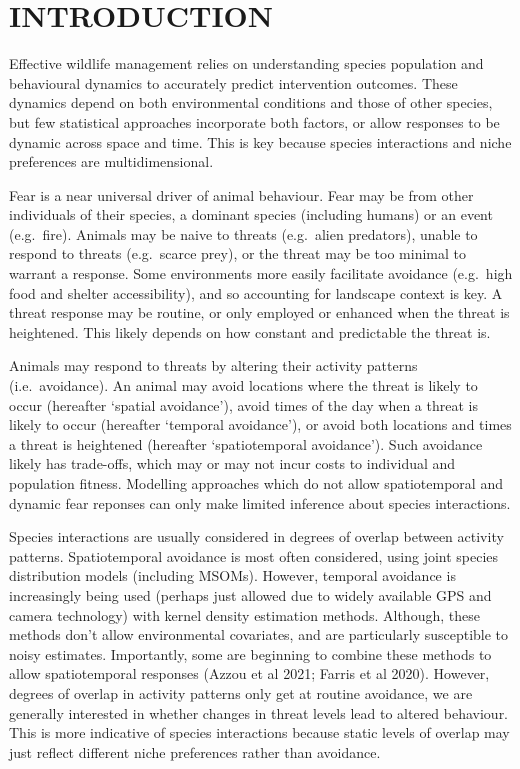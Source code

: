 \documentclass[]{elsarticle} %
\begin{document}
\hypertarget{introduction}{%
\section{INTRODUCTION}\label{introduction}}

Effective wildlife management relies on understanding species population and behavioural dynamics to accurately predict intervention outcomes. These dynamics depend on both environmental conditions and those of other species, but few statistical approaches incorporate both factors, or allow responses to be dynamic across space and time. This is key because species interactions and niche preferences are multidimensional.

Fear is a near universal driver of animal behaviour. Fear may be from other individuals of their species, a dominant species (including humans) or an event (e.g.~fire). Animals may be naive to threats (e.g.~alien predators), unable to respond to threats (e.g.~scarce prey), or the threat may be too minimal to warrant a response. Some environments more easily facilitate avoidance (e.g.~high food and shelter accessibility), and so accounting for landscape context is key. A threat response may be routine, or only employed or enhanced when the threat is heightened. This likely depends on how constant and predictable the threat is.

Animals may respond to threats by altering their activity patterns (i.e.~avoidance). An animal may avoid locations where the threat is likely to occur (hereafter `spatial avoidance'), avoid times of the day when a threat is likely to occur (hereafter `temporal avoidance'), or avoid both locations and times a threat is heightened (hereafter `spatiotemporal avoidance'). Such avoidance likely has trade-offs, which may or may not incur costs to individual and population fitness. Modelling approaches which do not allow spatiotemporal and dynamic fear reponses can only make limited inference about species interactions.

Species interactions are usually considered in degrees of overlap between activity patterns. Spatiotemporal avoidance is most often considered, using joint species distribution models (including MSOMs). However, temporal avoidance is increasingly being used (perhaps just allowed due to widely available GPS and camera technology) with kernel density estimation methods. Although, these methods don't allow environmental covariates, and are particularly susceptible to noisy estimates. Importantly, some are beginning to combine these methods to allow spatiotemporal responses (Azzou et al 2021; Farris et al 2020). However, degrees of overlap in activity patterns only get at routine avoidance, we are generally interested in whether changes in threat levels lead to altered behaviour. This is more indicative of species interactions because static levels of overlap may just reflect different niche preferences rather than avoidance.
\end{document}
